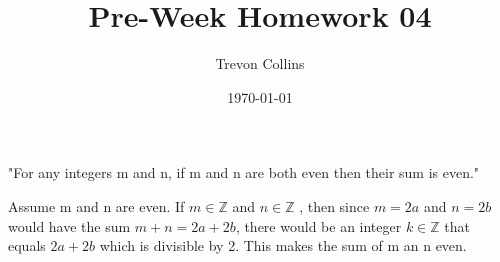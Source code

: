 \documentclass{article}
\title{Pre-Week Homework 04}
\author{Trevon Collins}
\date{\today}
\begin{document}
\maketitle

"For any integers m and n, if m and n are both even then their sum is even."

Assume m and n are even. If $m \in \mathbb{Z}$ and $n \in \mathbb{Z}$
, then since $m=2a$ and $n=2b$ would have the sum $m+n=2a+2b$, there 
would be an integer $k \in \mathbb{Z}$ that equals $2a + 2b$ which 
is divisible by 2. This makes the sum of m an n even.
\end{document}

